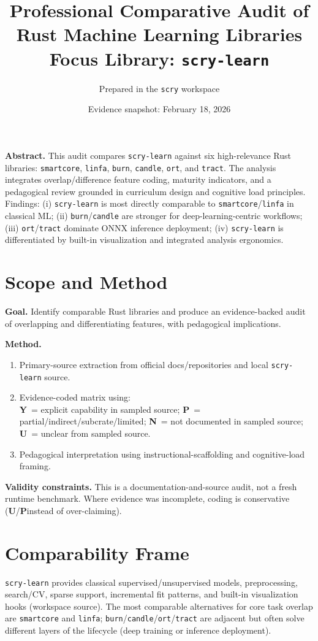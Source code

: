 \documentclass[11pt]{article}
\title{Professional Comparative Audit of Rust Machine Learning Libraries\\\large Focus Library: \texttt{scry-learn}}
\author{Prepared in the \texttt{scry} workspace}
\date{Evidence snapshot: February 18, 2026}
\newcommand{\Y}{\textbf{Y}}
\newcommand{\Part}{\textbf{P}}
\newcommand{\N}{\textbf{N}}
\newcommand{\U}{\textbf{U}}
\begin{document}
\maketitle

\textbf{Abstract.} This audit compares \texttt{scry-learn} against six high-relevance Rust libraries: \texttt{smartcore}, \texttt{linfa}, \texttt{burn}, \texttt{candle}, \texttt{ort}, and \texttt{tract}. The analysis integrates overlap/difference feature coding, maturity indicators, and a pedagogical review grounded in curriculum design and cognitive load principles. Findings: (i) \texttt{scry-learn} is most directly comparable to \texttt{smartcore}/\texttt{linfa} in classical ML; (ii) \texttt{burn}/\texttt{candle} are stronger for deep-learning-centric workflows; (iii) \texttt{ort}/\texttt{tract} dominate ONNX inference deployment; (iv) \texttt{scry-learn} is differentiated by built-in visualization and integrated analysis ergonomics.

\section{Scope and Method}
\textbf{Goal.} Identify comparable Rust libraries and produce an evidence-backed audit of overlapping and differentiating features, with pedagogical implications.

\textbf{Method.}
\begin{enumerate}[leftmargin=1.4em]
\item Primary-source extraction from official docs/repositories and local \texttt{scry-learn} source.
\item Evidence-coded matrix using:\\
\Y\ = explicit capability in sampled source; \Part\ = partial/indirect/subcrate/limited; \N\ = not documented in sampled source; \U\ = unclear from sampled source.
\item Pedagogical interpretation using instructional-scaffolding and cognitive-load framing.
\end{enumerate}

\textbf{Validity constraints.} This is a documentation-and-source audit, not a fresh runtime benchmark. Where evidence was incomplete, coding is conservative (\U/\Part instead of over-claiming).

\section{Comparability Frame}
\texttt{scry-learn} provides classical supervised/unsupervised models, preprocessing, search/CV, sparse support, incremental fit patterns, and built-in visualization hooks (workspace source). The most comparable alternatives for core task overlap are \texttt{smartcore} and \texttt{linfa}; \texttt{burn}/\texttt{candle}/\texttt{ort}/\texttt{tract} are adjacent but often solve different layers of the lifecycle (deep training or inference deployment).
\end{document}
